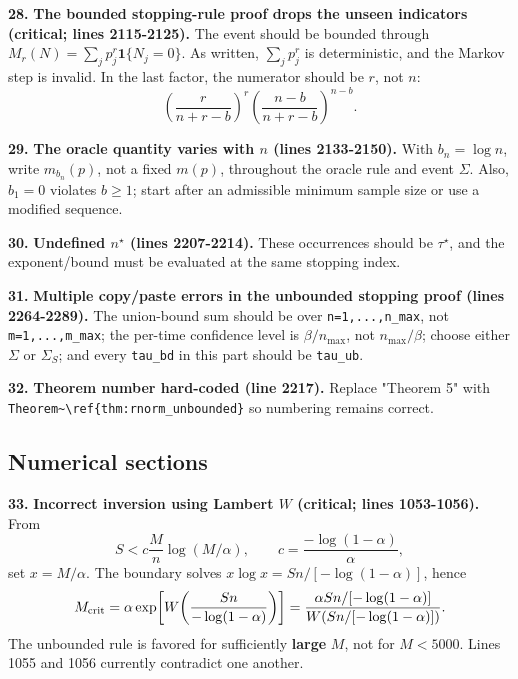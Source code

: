 \documentclass[10pt,a4paper]{article}
\begin{document}
\par\medskip\noindent\textbf{28.} \textbf{The bounded stopping-rule proof drops the unseen indicators (critical; lines 2115-2125).} The event should be bounded through
\(M_r(N)=\sum_jp_j^r\mathbf1\{N_j=0\}\). As written, \(\sum_jp_j^r\) is deterministic, and the Markov step is invalid. In the last factor, the numerator should be \(r\), not \(n\):
\[
    \left(\frac{r}{n+r-b}\right)^r
    \left(\frac{n-b}{n+r-b}\right)^{n-b}.
\]

\par\medskip\noindent\textbf{29.} \textbf{The oracle quantity varies with \(n\) (lines 2133-2150).} With \(b_n=\log n\), write \(m_{b_n}(p)\), not a fixed \(m(p)\), throughout the oracle rule and event \(\Sigma\). Also, \(b_1=0\) violates \(b\ge1\); start after an admissible minimum sample size or use a modified sequence.

\par\medskip\noindent\textbf{30.} \textbf{Undefined \(n^\star\) (lines 2207-2214).} These occurrences should be \(\tau^\star\), and the exponent/bound must be evaluated at the same stopping index.

\par\medskip\noindent\textbf{31.} \textbf{Multiple copy/paste errors in the unbounded stopping proof (lines 2264-2289).} The union-bound sum should be over \texttt{n=1,...,n\_\allowbreak{}max}, not \texttt{m=1,...,m\_\allowbreak{}max}; the per-time confidence level is \(\beta/n_{\max}\), not \(n_{\max}/\beta\); choose either \(\Sigma\) or \(\Sigma_S\); and every \texttt{tau\_\allowbreak{}bd} in this part should be \texttt{tau\_\allowbreak{}ub}.

\par\medskip\noindent\textbf{32.} \textbf{Theorem number hard-coded (line 2217).} Replace "Theorem 5" with \texttt{Theorem\textasciitilde{}\allowbreak{}\textbackslash{}\allowbreak{}ref\{\allowbreak{}thm:rnorm\_\allowbreak{}unbounded\}\allowbreak{}} so numbering remains correct.

\subsection*{Numerical sections}

\par\medskip\noindent\textbf{33.} \textbf{Incorrect inversion using Lambert \(W\) (critical; lines 1053-1056).} From
\[
    S<c\frac Mn\log(M/\alpha),\qquad c=\frac{-\log(1-\alpha)}{\alpha},
\]
set \(x=M/\alpha\). The boundary solves
\(x\log x=Sn/[-\log(1-\alpha)]\), hence
\[
    M_{\rm crit}
    =\alpha\exp\!\left[W\!\left(\frac{Sn}{-\log(1-\alpha)}\right)\right]
    =\frac{\alpha Sn/[-\log(1-\alpha)]}{W(Sn/[-\log(1-\alpha)])}.
\]
The unbounded rule is favored for sufficiently \textbf{large} \(M\), not for \(M<5000\). Lines 1055 and 1056 currently contradict one another.
\end{document}
